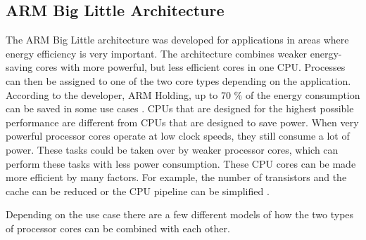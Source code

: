 \subsection{ARM Big Little Architecture}
The ARM Big Little architecture was developed for applications in areas where energy efficiency is very important. 
The architecture combines weaker energy-saving cores with more powerful, but less efficient cores in one CPU. 
Processes can then be assigned to one of the two core types depending on the application. 
According to the developer, ARM Holding, up to 70 \% of the energy consumption can be saved in some use cases
\cite{bigLITTL50:online}. 
CPUs that are designed for the highest possible performance are different from CPUs that are designed to save power. 
When very powerful processor cores operate at low clock speeds, they still consume a lot of power. These tasks could be taken over by weaker processor cores, which can perform these tasks with less power consumption. 
These CPU cores can be made more efficient by many factors. 
For example, the number of transistors and the cache can be reduced or the CPU pipeline can be simplified
\cite{TenThing97:online}.

Depending on the use case there are a few different models of how the two types of processor cores can be combined with each other. 

